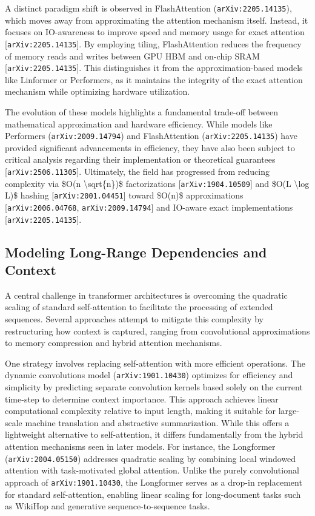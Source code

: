 \documentclass[11pt]{article}
\begin{document}
A distinct paradigm shift is observed in FlashAttention (\texttt{arXiv:2205.14135}), which moves away from approximating the attention mechanism itself. Instead, it focuses on IO-awareness to improve speed and memory usage for exact attention [\texttt{arXiv:2205.14135}]. By employing tiling, FlashAttention reduces the frequency of memory reads and writes between GPU HBM and on-chip SRAM [\texttt{arXiv:2205.14135}]. This distinguishes it from the approximation-based models like Linformer or Performers, as it maintains the integrity of the exact attention mechanism while optimizing hardware utilization.

The evolution of these models highlights a fundamental trade-off between mathematical approximation and hardware efficiency. While models like Performers (\texttt{arXiv:2009.14794}) and FlashAttention (\texttt{arXiv:2205.14135}) have provided significant advancements in efficiency, they have also been subject to critical analysis regarding their implementation or theoretical guarantees [\texttt{arXiv:2506.11305}]. Ultimately, the field has progressed from reducing complexity via \$O(n \textbackslash{}sqrt\{n\})\$ factorizations [\texttt{arXiv:1904.10509}] and \$O(L \textbackslash{}log L)\$ hashing [\texttt{arXiv:2001.04451}] toward \$O(n)\$ approximations [\texttt{arXiv:2006.04768}, \texttt{arXiv:2009.14794}] and IO-aware exact implementations [\texttt{arXiv:2205.14135}].

\subsection{Modeling Long-Range Dependencies and Context}

A central challenge in transformer architectures is overcoming the quadratic scaling of standard self-attention to facilitate the processing of extended sequences. Several approaches attempt to mitigate this complexity by restructuring how context is captured, ranging from convolutional approximations to memory compression and hybrid attention mechanisms.

One strategy involves replacing self-attention with more efficient operations. The dynamic convolutions model (\texttt{arXiv:1901.10430}) optimizes for efficiency and simplicity by predicting separate convolution kernels based solely on the current time-step to determine context importance. This approach achieves linear computational complexity relative to input length, making it suitable for large-scale machine translation and abstractive summarization. While this offers a lightweight alternative to self-attention, it differs fundamentally from the hybrid attention mechanisms seen in later models. For instance, the Longformer (\texttt{arXiv:2004.05150}) addresses quadratic scaling by combining local windowed attention with task-motivated global attention. Unlike the purely convolutional approach of \texttt{arXiv:1901.10430}, the Longformer serves as a drop-in replacement for standard self-attention, enabling linear scaling for long-document tasks such as WikiHop and generative sequence-to-sequence tasks.
\end{document}
